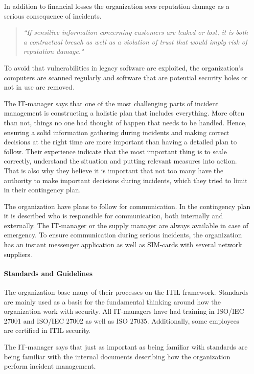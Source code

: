 In addition to financial losses the organization sees reputation damage as a serious consequence of incidents. 
\begin{quote}
\textit{``If sensitive information concerning customers are leaked or lost, it is both a contractual breach as well as a violation of trust that would imply risk of reputation damage."}
\end{quote}

To avoid that vulnerabilities in legacy software are exploited, the organization's computers are scanned regularly and software that are potential security holes or not in use are removed. 

The IT-manager says that one of the most challenging parts of incident management is constructing a holistic plan that includes everything. More often than not, things no one had thought of happen that needs to be handled. Hence, ensuring a solid information gathering during incidents and making correct decisions at the right time are more important than having a detailed plan to follow. Their experience indicate that the most important thing is to scale correctly, understand the situation and putting relevant measures into action. That is also why they believe it is important that not too many have the authority to make important decisions during incidents, which they tried to limit in their contingency plan.

The organization have plans to follow for communication. In the contingency plan it is described who is responsible for communication, both internally and externally. The IT-manager or the supply manager are always available in case of emergency. To ensure communication during serious incidents, the organization has an instant messenger application as well as SIM-cards with several network suppliers. 

\paragraph{Standards and Guidelines}
The organization base many of their processes on the ITIL framework. Standards are mainly used as a basis for the fundamental thinking around how the organization work with security. All IT-managers have had training in ISO/IEC 27001 and ISO/IEC 27002 as well as ISO 27035. Additionally, some employees are certified in ITIL security.   

The IT-manager says that just as important as being familiar with standards are being familiar with the internal documents describing how the organization perform incident management. 

